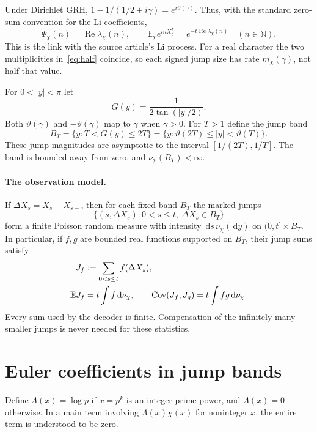 \documentclass[11pt]{article}
\theoremstyle{definition}
\newcommand{\N}{\mathbb N}
\newcommand{\E}{\mathbb E}
\newcommand{\Cov}{\operatorname{Cov}}
\newcommand{\Rea}{\operatorname{Re}}
\newcommand{\dd}{\,\mathrm d}
\newcommand{\abs}[1]{\left|#1\right|}
\newcommand{\angles}{\vartheta}
\begin{document}
Under Dirichlet GRH,
$1-1/(1/2+i\gamma)=e^{i\angles(\gamma)}$. Thus, with the standard
zero-sum convention for the Li coefficients,
\begin{equation}\label{eq:li}
 \Psi_\chi(n)=\Rea\lambda_\chi(n),\qquad
 \E_\chi e^{inX^\chi_t}=e^{-t\Rea\lambda_\chi(n)}
 \quad(n\in\N).
\end{equation}
This is the link with the source article's Li process. For a real character the
two multiplicities in~\eqref{eq:half} coincide, so each signed jump size has
rate $m_\chi(\gamma)$, not half that value.

For $0<\abs y<\pi$ let
\begin{equation}\label{eq:inverse}
 G(y)=\frac1{2\tan(\abs y/2)}.
\end{equation}
Both $\angles(\gamma)$ and $-\angles(\gamma)$ map to $\gamma$ when $\gamma>0$.
For $T>1$ define the jump band
\begin{equation}\label{eq:band}
 B_T=\{y:T<G(y)\le2T\}
     =\{y:\angles(2T)\le\abs y<\angles(T)\}.
\end{equation}
These jump magnitudes are asymptotic to the interval $[1/(2T),1/T]$.
The band is bounded away from zero, and $\nu_\chi(B_T)<\infty$.

\paragraph{The observation model.}
If $\Delta X_s=X_s-X_{s-}$, then for each fixed band $B_T$ the marked jumps
\[
 \{(s,\Delta X_s):0<s\le t,\ \Delta X_s\in B_T\}
\]
form a finite Poisson random measure with intensity
$\dd s\,\nu_\chi(\dd y)$ on $(0,t]\times B_T$. In particular, if $f,g$ are
bounded real functions supported on $B_T$, their jump sums satisfy
\begin{align}
 J_f&:=\sum_{0<s\le t}f(\Delta X_s),\notag\\
 \E J_f&=t\int f\dd\nu_\chi,\qquad
 \Cov(J_f,J_g)=t\int fg\dd\nu_\chi.\label{eq:poisson}
\end{align}
Every sum used by the decoder is finite. Compensation of the infinitely many
smaller jumps is never needed for these statistics.

\section{Euler coefficients in jump bands}
\label{sec:landau}

Define $\Lambda(x)=\log p$ if $x=p^k$ is an integer prime power, and
$\Lambda(x)=0$ otherwise. In a main term involving $\Lambda(x)\chi(x)$ for
noninteger $x$, the entire term is understood to be zero.
\end{document}
